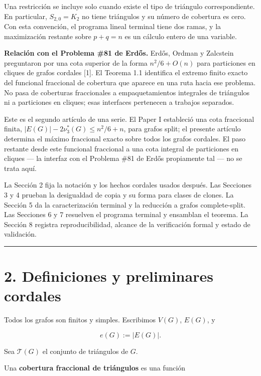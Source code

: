 \documentclass[
  11pt,
]{article}
\begin{document}
Una restricción se incluye solo cuando existe el tipo de triángulo
correspondiente. En particular, \(S_{2,0}=K_2\) no tiene triángulos y su
número de cobertura es cero. Con esta convención, el programa lineal
terminal tiene dos ramas, y la maximización restante sobre \(p+q=n\) es
un cálculo entero de una variable.

\textbf{Relación con el Problema \#81 de Erdős.} Erdős, Ordman y
Zalcstein preguntaron por una cota superior de la forma \(n^2/6+O(n)\)
para particiones en cliques de grafos cordales {[}1{]}. El Teorema 1.1
identifica el extremo finito exacto del funcional fraccional de
cobertura que aparece en una ruta hacia ese problema. No pasa de
coberturas fraccionales a empaquetamientos integrales de triángulos ni a
particiones en cliques; esas interfaces pertenecen a trabajos separados.

Este es el segundo artículo de una serie. El Paper I estableció una cota
fraccional finita, \(|E(G)|-2\nu_3^*(G)\le n^2/6+n\), para grafos split;
el presente artículo determina el máximo fraccional exacto sobre todos
los grafos cordales. El paso restante desde este funcional fraccional a
una cota integral de particiones en cliques --- la interfaz con el
Problema \#81 de Erdős propiamente tal --- no se trata aquí.

La Sección 2 fija la notación y los hechos cordales usados después. Las
Secciones 3 y 4 prueban la desigualdad de copia y su forma para clases
de clones. La Sección 5 da la caracterización terminal y la reducción a
grafos complete-split. Las Secciones 6 y 7 resuelven el programa
terminal y ensamblan el teorema. La Sección 8 registra reproducibilidad,
alcance de la verificación formal y estado de validación.

\begin{center}\rule{0.5\linewidth}{0.5pt}\end{center}

\section{2. Definiciones y preliminares
cordales}\label{definiciones-y-preliminares-cordales}

Todos los grafos son finitos y simples. Escribimos \(V(G)\), \(E(G)\), y

\[
e(G):=|E(G)|.
\]

Sea \(\mathcal T(G)\) el conjunto de triángulos de \(G\).

Una \textbf{cobertura fraccional de triángulos} es una función
\end{document}
